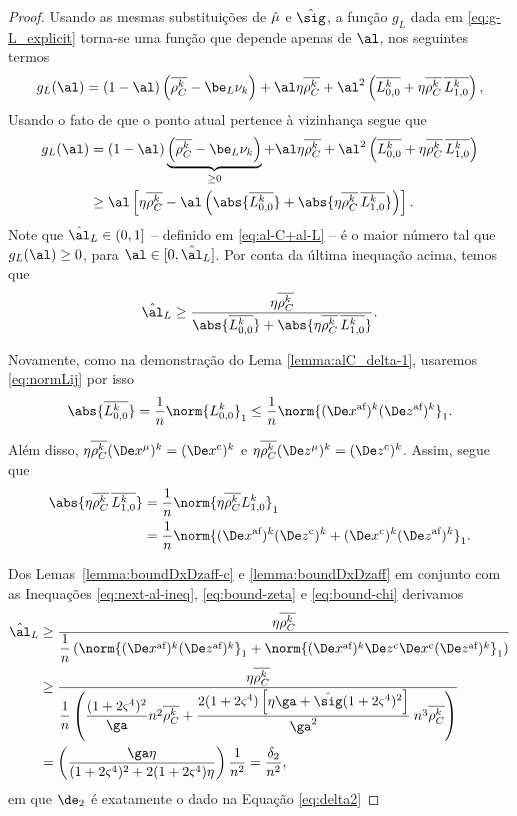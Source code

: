 \begin{proof}

Usando as mesmas substituições de $\hat{\mu}$ e $\nextsig$, a função $g_L$ dada em \eqref{eq:g-L_explicit} torna-se uma função que depende apenas de $\al$, nos seguintes termos 
\[
g_L(\al) =     (1-\al)\left(\rhoCkb  -  \be_L \nuk    \right) +  \al\eta\rhoCkb  + 
   \al^2\left( \dbvec{L_{0,0}^{k}} + \eta\rhoCkb   \,\dbvec{L_{1,0}^{k}}   \right ) ,
	\]
Usando  o fato de que o ponto atual pertence à  vizinhança segue que 
 \[
\begin{aligned}
{g}_L(\al) & =     (1-\al)\underbrace{\left(\rhoCkb  -  \be_L \nuk    \right)}_{\geq 0} +  \al\eta\rhoCkb  + 
   \al^2\left( \dbvec{L_{0,0}^{k}} + \eta\rhoCkb  \, \dbvec{L_{1,0}^{k}}   \right ) \\
   & \geq  \al\left[\eta\rhoCkb  - 
   \al \left(\abs{\dbvec{L_{0,0}^{k}}} + \abs{\eta\rhoCkb\,  \dbvec{L_{1,0}^{k}}}\right)   \right ].
\end{aligned}
 \]
Note que  $\nextal_L\in(0,1]$ -- definido em \eqref{eq:al-C+al-L} -- é o maior número tal que  $g_L(\al)\geq 0$, para  $\al\in[0,\nextal_L]$. Por conta da última inequação acima, temos que 
\begin{equation}
	\label{eq:next-al-ineq}
\nextal_L \geq \frac{\eta\rhoCkb  }{\abs{\dbvec{L_{0,0}^{k}}} + \abs{\eta\rhoCkb \,  \dbvec{L_{1,0}^{k}}}}.
\end{equation}

Novamente, como na demonstração do Lema \ref{lemma:alC_delta-1}, usaremos \eqref{eq:normLij} por isso
\begin{equation}
\abs{\dbvec{L_{0,0}^{k}}}  = \frac{1}{n}\norm{L_{0,0}^{k}}_{1}  \leq \dfrac{1}{n} \norm{ \dekx  \dekz }_1 .  \label{eq:bound-zeta}
\end{equation}

Além disso,  $\eta\rhoCkb (\Dex^\mu)^{k} = \Dekcox $  e $  \eta\rhoCkb (\Dez^\mu)^{k} = \Dekcoz$.
Assim,  segue que
	\begin{align}
	\abs{\eta\rhoCkb \,  \dbvec{L_{1,0}^{k}}} & = \dfrac{1}{n}\norm{\eta\rhoCkb L_{1,0}^{k}}_{1}  \notag \\
	& =  \dfrac{1}{n} \norm{ \dekx \Dekcoz + \Dekcox \dekz }_1.\label{eq:bound-chi}
	\end{align}


Dos Lemas~\ref{lemma:boundDxDzaff-c} e  \ref{lemma:boundDxDzaff} em conjunto com  as Inequações \eqref{eq:next-al-ineq}, \eqref{eq:bound-zeta} e \eqref{eq:bound-chi} derivamos
\[
\begin{aligned}
\nextal_L  & \geq \frac{\eta\rhoCkb  } {\dfrac{1}{n} \left(\norm{ \dekx  \dekz }_1 +  \norm{ \dekx \Decoz  \Decox \dekz }_1 \right) } \\
		   & \geq \dfrac{\eta\rhoCkb  } {\dfrac{1}{n} \left(\dfrac{(1 + 2\bdxzstar^{4})^{2} }{\ga} n^{2}\rhoCkb + \dfrac{2(1+2\bdxzstar^{4})\left[\eta\ga + \nextsig(1+2\bdxzstar^{4})^{2}\right]}{\ga^{2}}\: n^{3}\rhoCkb  \right) } \\
		   & = \left( \dfrac{\ga\eta } {(1 + 2\bdxzstar^{4})^{2}  + 2(1+2\bdxzstar^{4})\eta}\right) \dfrac{1}{n^{2}} = \frac{\delta_{2}}{n^{2}}, 
\end{aligned}
\]
em que $\de_{2}$ é exatamente o dado na Equação \eqref{eq:delta2}
\end{proof}
 
